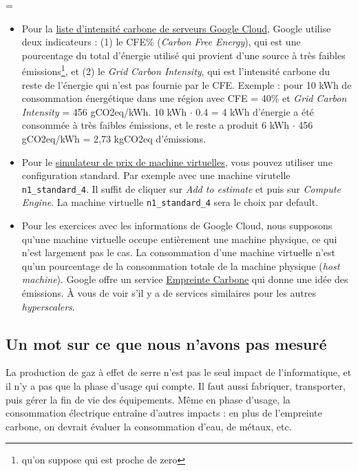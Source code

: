 \documentclass[a4paper,10pt]{article}
\newenvironment{information}
  {\par\begin{mdframed}[linewidth=2pt,linecolor=blue]%
    \begin{list}{}{\leftmargin=1cm
                   \labelwidth=\leftmargin}\item[\emoji{information}]}
  {\end{list}\end{mdframed}\par}
\begin{document}
\begin{information}
    \begin{itemize}
        \item Pour la
        \href{https://cloud.google.com/sustainability/region-carbon}{liste
        d'intensité carbone de serveurs Google Cloud}, Google utilise deux
        indicateurs : (1) le CFE\% (\textit{Carbon Free Energy}), qui est une
        pourcentage du total d'énergie utilisé qui provient d'une source à très
        faibles émissions\footnote{qu'on suppose qui est proche de zero}, et (2) le \textit{Grid Carbon Intensity}, qui est
        l'intensité carbone du reste de l'énergie qui n'est pas fournie par le
        CFE. Exemple : pour 10 kWh de consommation énergétique dans une région
        avec CFE = 40\% et \textit{Grid Carbon Intensity} = 456 gCO2eq/kWh. 10
        kWh $\cdot$ 0.4 = 4 kWh d'énergie a été consommée à très faibles
        émissions, et le reste a produit 6 kWh $\cdot$ 456 gCO2eq/kWh = 2,73
        kgCO2eq d'émissions.
        \item Pour le \href{https://cloud.google.com/products/calculator}{simulateur de
        prix de machine virtuelles}, vous pouvez utiliser une configuration
        standard. Par exemple avec une machine virutelle
        \texttt{n1\_standard\_4}. Il suffit de cliquer sur \textit{Add to
        estimate} et puis sur \textit{Compute Engine}. La machine virtuelle
        \texttt{n1\_standard\_4} sera le choix par default.
        \item Pour les exercices avec les informations de Google Cloud, nous
        supposons qu’une machine virtuelle occupe entièrement une machine
        physique, ce qui n'est largement pas le cas. La consommation d'une
        machine virtuelle n'est qu'un pourcentage de la consommation totale de
        la machine physique (\textit{host machine}). Google offre un service
        \href{https://cloud.google.com/carbon-footprint?hl=fr}{Empreinte
        Carbone} qui donne une idée des émissions. À vous de voir s'il y a de
        services similaires pour les autres \textit{hyperscalers}. 
    \end{itemize}
\end{information}




\subsection{Un mot sur ce que nous n'avons pas mesuré}

La production de gaz à effet de serre n'est pas le seul impact de
l'informatique, et il n'y a pas que la phase d'usage qui compte. Il faut aussi
fabriquer, transporter, puis gérer la fin de vie des équipements. Même en phase
d'usage, la consommation électrique entraîne d'autres impacts : en plus de
l'empreinte carbone, on devrait évaluer la consommation d'eau, de métaux, etc.
\end{document}
